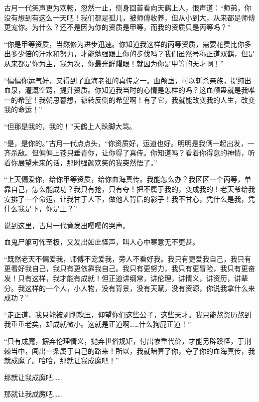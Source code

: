 
\begin{this_body}



古月一代笑声更为欢畅，忽然一止，侧身回首看向天鹤上人，恨声道：“师弟，你没有想到有这么一天吧！我们都是孤儿，被师傅收养，但从小到大，从来都是师傅更宠你。为什么？还不是因为你的资质是甲等，而我的资质只是丙等吗？”

“你是甲等资质，当然修为进步迅速。你知道我这样的丙等资质，需要花费比你多出多少倍的汗水和努力，才能勉强跟上你的步伐吗？我们虽然号称正道双鹤，但是从来都是你为主，我为次，你最光鲜耀眼！就因为你是甲等的天才啊！”

“偏偏你运气好，又得到了血海老祖的真传之一。血颅蛊，可以斩杀亲族，提纯出血泉，灌溉空窍，提升资质。你知道我当时的心情是怎样的吗？这血颅蛊就是我唯一的希望！我朝思暮想，辗转反侧的希望啊！有了它，我就能改变我的人生，改变我的命运！”

“但那是我的，我的！”天鹤上人跺脚大骂。

“是，是你的。”古月一代点点头，“你资质好，运道也好。明明是我俩一起出发，一齐杀敌。但偏偏上苍只垂青你，让你得了真传。你知道吗？看着你得意的神情，听着你展望未来的话，那时强颜欢笑的我突然悟了。”

“上天偏爱你，给你甲等资质，给你血海真传。我能怎么办？我区区一个丙等，单靠自己，怎么能成功？我只有抢，只有夺！把不属于我的，变成我的！老天爷给我安排了一个命运，让我甘于人下，做他人背后的影子！我不甘心，凭什么是我，凭什么我是下，你是上？”

说到这里，古月一代竟发出嘤嘤的哭声。

血鬼尸躯可怖至极，又发出如此怪声，叫人心中寒意无不更甚。

“既然老天不偏爱我，师傅不宠爱我，旁人不看好我。我只有更爱我自己，我只有更看好我自己，我只有更依靠我自己。我只有更努力，我只有更冒险，我只有更奋发！只有这样，我才能有成就！但正道讲纲常，讲伦理，讲情义，讲资历，讲辈分。我这样的一个人，小人物，没有背景，没有天赋，没有资源，你说我拿什么来成功？”

“走正道，我只能被剥削欺压，仰望你们这些公子，这些天才。我只能熬资历熬到我垂垂老矣，却成就微小。这就是正道啊……什么狗屁正道！”

“只有成魔，摒弃伦理情义，抛弃世俗规矩，付出惨重代价，才能另辟蹊径，于荆棘当中，闯出一条属于自己的路来！所以，我就暗算了你，夺了你的血海真传，我就成魔了。哈哈，那就让我成魔吧！”

那就让我成魔吧……

那就让我成魔吧……


\end{this_body}
